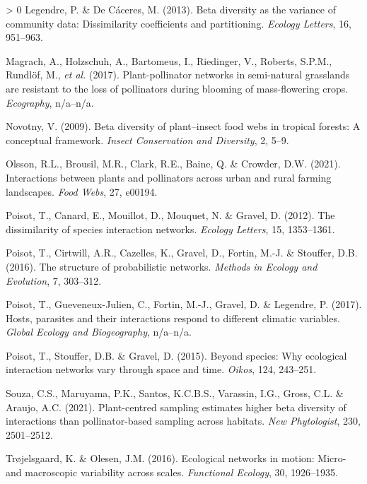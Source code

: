 \documentclass[10pt,oneside]{article}
\newlength{\cslhangindent}
\newenvironment{CSLReferences}[3] %
 {%
  \setlength{\parindent}{0pt}
  \ifodd #1 \everypar{\setlength{\hangindent}{\cslhangindent}}\ignorespaces\fi
  \ifnum #2 > 0
  \setlength{\parskip}{#2\baselineskip}
  \fi
 }%
 {}
\begin{document}
\begin{CSLReferences}{1}{0}
\leavevmode\hypertarget{ref-Legendre2013BetDiv}{}%
Legendre, P. \& De Cáceres, M. (2013). Beta diversity as the variance of
community data: Dissimilarity coefficients and partitioning.
\emph{Ecology Letters}, 16, 951--963.

\leavevmode\hypertarget{ref-Magrach2017PlaNet}{}%
Magrach, A., Holzschuh, A., Bartomeus, I., Riedinger, V., Roberts,
S.P.M., Rundlöf, M., \emph{et al.} (2017). Plant-pollinator networks in
semi-natural grasslands are resistant to the loss of pollinators during
blooming of mass-flowering crops. \emph{Ecography}, n/a--n/a.

\leavevmode\hypertarget{ref-Novotny2009BetDiv}{}%
Novotny, V. (2009). Beta diversity of plant--insect food webs in
tropical forests: A conceptual framework. \emph{Insect Conservation and
Diversity}, 2, 5--9.

\leavevmode\hypertarget{ref-Olsson2021IntPla}{}%
Olsson, R.L., Brousil, M.R., Clark, R.E., Baine, Q. \& Crowder, D.W.
(2021). Interactions between plants and pollinators across urban and
rural farming landscapes. \emph{Food Webs}, 27, e00194.

\leavevmode\hypertarget{ref-Poisot2012DisSpe}{}%
Poisot, T., Canard, E., Mouillot, D., Mouquet, N. \& Gravel, D. (2012).
The dissimilarity of species interaction networks. \emph{Ecology
Letters}, 15, 1353--1361.

\leavevmode\hypertarget{ref-Poisot2016StrPro}{}%
Poisot, T., Cirtwill, A.R., Cazelles, K., Gravel, D., Fortin, M.-J. \&
Stouffer, D.B. (2016). The structure of probabilistic networks.
\emph{Methods in Ecology and Evolution}, 7, 303--312.

\leavevmode\hypertarget{ref-Poisot2017HosPar}{}%
Poisot, T., Gueveneux-Julien, C., Fortin, M.-J., Gravel, D. \& Legendre,
P. (2017). Hosts, parasites and their interactions respond to different
climatic variables. \emph{Global Ecology and Biogeography}, n/a--n/a.

\leavevmode\hypertarget{ref-Poisot2015SpeWhy}{}%
Poisot, T., Stouffer, D.B. \& Gravel, D. (2015). Beyond species: Why
ecological interaction networks vary through space and time.
\emph{Oikos}, 124, 243--251.

\leavevmode\hypertarget{ref-Souza2021PlaSam}{}%
Souza, C.S., Maruyama, P.K., Santos, K.C.B.S., Varassin, I.G., Gross,
C.L. \& Araujo, A.C. (2021). Plant-centred sampling estimates higher
beta diversity of interactions than pollinator-based sampling across
habitats. \emph{New Phytologist}, 230, 2501--2512.

\leavevmode\hypertarget{ref-Trojelsgaard2016EcoNet}{}%
Trøjelsgaard, K. \& Olesen, J.M. (2016). Ecological networks in motion:
Micro- and macroscopic variability across scales. \emph{Functional
Ecology}, 30, 1926--1935.


\end{CSLReferences}
\end{document}
